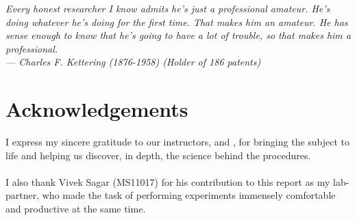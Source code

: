 
\begin{flushright}{\slshape    
Every honest researcher I know admits he's just a professional amateur.
He's doing whatever he's doing for the first time. That makes him an amateur.
He has sense enough to know that he's going to have a lot of trouble,
so that makes him a professional.\\ \medskip
--- Charles F. Kettering (1876-1958) (Holder of 186 patents)}
\end{flushright}



\bigskip

\begingroup
\let\clearpage\relax
\let\cleardoublepage\relax
\let\cleardoublepage\relax
\chapter*{Acknowledgements}
I express my sincere gratitude to our instructors, \myProf and \myOtherProf, for bringing the subject to life and helping us discover, in depth, the science behind the procedures.\\
 \\
I also thank Vivek Sagar (MS11017) for his contribution to this report as my lab-partner, who made the task of performing experiments immensely comfortable and productive at the same time.\\
\bigskip


\endgroup



